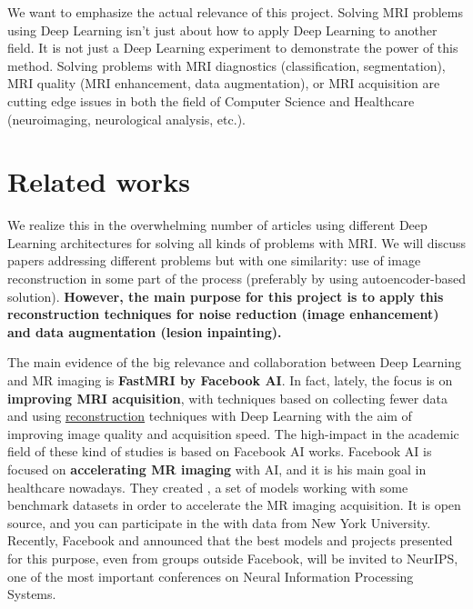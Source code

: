 We want to emphasize the actual relevance of this project. Solving MRI problems using Deep Learning isn't just about how to apply Deep Learning to another field. It is not just a Deep Learning experiment to demonstrate the power of this method. Solving problems with MRI diagnostics (classification, segmentation), MRI quality (MRI enhancement, data augmentation), or MRI acquisition are cutting edge issues in both the field of Computer Science and Healthcare (neuroimaging, neurological analysis, etc.). 



\section{Related works}

We realize this in the overwhelming number of articles using different Deep Learning architectures for solving all kinds of problems with MRI. We will discuss papers addressing different problems but with one similarity: use of image reconstruction in some part of the process (preferably by using autoencoder-based solution). \textbf{However, the main purpose for this project is to apply this reconstruction techniques for noise reduction (image enhancement) and data augmentation (lesion inpainting).}

The main evidence of the big relevance and collaboration between Deep Learning and MR imaging is \textbf{FastMRI by Facebook AI}. In fact, lately, the focus is on \textbf{improving MRI acquisition}, with techniques based on collecting fewer data and using \underline{reconstruction} techniques with Deep Learning with the aim of improving image quality and acquisition speed. The high-impact in the academic field of these kind of studies is based on Facebook AI works. Facebook AI is focused on \textbf{accelerating MR imaging} with AI, and it is his main goal in healthcare nowadays. They created  \cite{fastmri}, a set of models working with some benchmark datasets in order to accelerate the MR imaging acquisition. It is open source, and you can participate in the  with data from New York University. Recently, Facebook and  announced that the best models and projects presented for this purpose, even from groups outside Facebook, will be invited to NeurIPS, one of the most important conferences on Neural Information Processing Systems.

